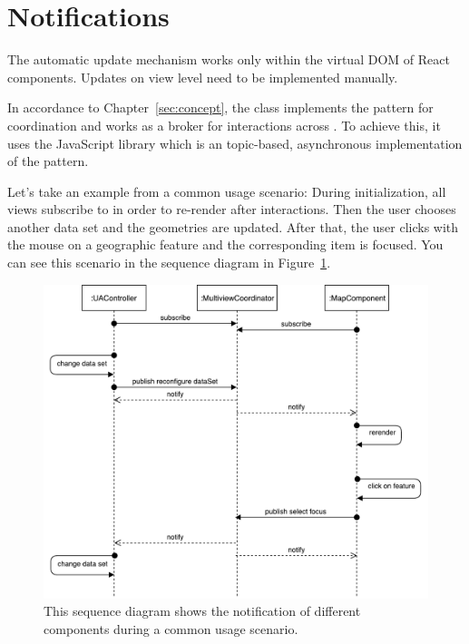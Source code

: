 \section{Notifications}

The automatic update mechanism works only within the virtual DOM of React components.
Updates on view level need to be implemented manually.

In accordance to Chapter~\ref{sec:concept}, the class  implements the  pattern for coordination and works as a broker for interactions across \cmvs{}.
To achieve this, it uses the JavaScript library  which is an topic-based, asynchronous implementation of the pattern.

Let's take an example from a common usage scenario:
During initialization, all views subscribe to  in order to re-render after interactions.
Then the user chooses another data set and the geometries are updated.
After that, the user clicks with the mouse on a geographic feature and the corresponding item is focused.
You can see this scenario in the sequence diagram in Figure~\ref{fig:implementation:sequence-diagram}.

\begin{figure}[ht]
  \centering
  \caption{%
    This sequence diagram shows the notification of different components during a common usage scenario.
  }\label{fig:implementation:sequence-diagram}
  \includegraphics[width=\textwidth]{figures/implementation/SequenceDiagram}
\end{figure}


